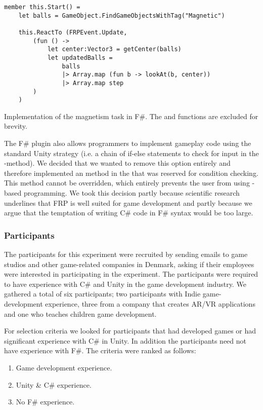 \begin{listing}[H]
    \begin{verbatim}
member this.Start() =
    let balls = GameObject.FindGameObjectsWithTag("Magnetic")

    this.ReactTo (FRPEvent.Update,
        (fun () ->
            let center:Vector3 = getCenter(balls)
            let updatedBalls =
                balls
                |> Array.map (fun b -> lookAt(b, center))
                |> Array.map step
        )
    )
    \end{verbatim}
    \caption{Implementation of the magnetism task in F\#. The  and  functions are excluded for brevity.}
    \label{lst:frp:example}
\end{listing}

The F\# plugin also allows programmers to implement gameplay code using the standard Unity strategy (i.e. a chain of if-else statements to check for input in the -method). We decided that we wanted to remove this option entirely and therefore implemented an  method in the  that was reserved for condition checking. This method cannot be overridden, which entirely prevents the user from using -based programming. We took this decision partly because scientific research underlines that \gls{FRP} is well suited for game development\cite{courtney2003yampa,cheong2005functional,maraffi:frp} and partly because we argue that the temptation of writing C\# code in F\# syntax would be too large.

\subsubsection{Participants} \label{sec:par-crit}
The participants for this experiment were recruited by sending emails to game studios and other game-related companies in Denmark, asking if their employees were interested in participating in the experiment. The participants were required to have experience with C\# and Unity in the game development industry. We gathered a total of six participants; two participants with Indie game-development experience, three from a company that creates \gls{AR}/\gls{VR} applications and one who teaches children game development.

For selection criteria we looked for participants that had developed games or had significant experience with C\# in Unity. In addition the participants need not have experience with F\#. The criteria were ranked as follows:
\begin{enumerate}
	\item Game development experience.
	\item Unity \& C\# experience.
	\item No F\# experience.
\end{enumerate}


